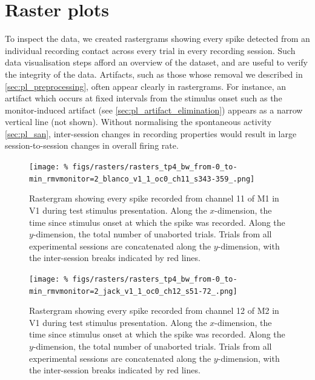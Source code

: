 \FloatBarrier
\section{Raster plots}
\label{sec:pl_rasters}

To inspect the data, we created rastergrams showing every spike detected from an individual recording contact across every trial in every recording session.
Such data visualisation steps afford an overview of the dataset, and are useful to verify the integrity of the data.
Artifacts, such as those whose removal we described in \autoref{sec:pl_preprocessing}, often appear clearly in rastergrams.
For instance, an artifact which occurs at fixed intervals from the stimulus onset such as the monitor-induced artifact (see \autoref{sec:pl_artifact_elimination}) appears as a narrow vertical line (not shown).
Without normalising the spontaneous activity \autoref{sec:pl_san}, inter-session changes in recording properties would result in large session-to-session changes in overall firing rate.


\begin{figure}[p]
    \centering
    \texttt{[image: \%
figs/rasters/rasters\_tp4\_bw\_from-0\_to-min\_rmvmonitor=2\_blanco\_v1\_1\_oc0\_ch11\_s343-359\_.png]}
    \label{fig:raster_blanco_v1}
    \caption{Rastergram showing every spike recorded from channel \num{11} of \ac{M1} in \ac{V1} during test stimulus presentation.
    Along the $x$-dimension, the time since stimulus onset at which the spike was recorded.
    Along the $y$-dimension, the total number of unaborted trials.
    Trials from all experimental sessions are concatenated along the $y$-dimension, with the inter-session breaks indicated by red lines.
}
\end{figure}


\begin{figure}[p]
    \centering
    \texttt{[image: \%
figs/rasters/rasters\_tp4\_bw\_from-0\_to-min\_rmvmonitor=2\_jack\_v1\_1\_oc0\_ch12\_s51-72\_.png]}
    \label{fig:raster_jack_v1}
    \caption{Rastergram showing every spike recorded from channel \num{12} of \ac{M2} in \ac{V1} during test stimulus presentation.
    Along the $x$-dimension, the time since stimulus onset at which the spike was recorded.
    Along the $y$-dimension, the total number of unaborted trials.
    Trials from all experimental sessions are concatenated along the $y$-dimension, with the inter-session breaks indicated by red lines.
}
\end{figure}


